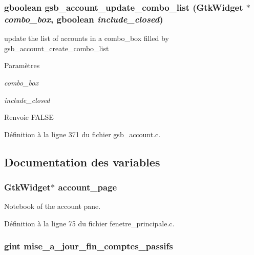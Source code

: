 \subsubsection[{gsb\_\-account\_\-update\_\-combo\_\-list}]{\setlength{\rightskip}{0pt plus 5cm}gboolean gsb\_\-account\_\-update\_\-combo\_\-list (GtkWidget $\ast$ {\em combo\_\-box}, \/  gboolean {\em include\_\-closed})}\label{gsb__account_8c_a62f0c33eae4fe6957f7668da14e47020}
update the list of accounts in a combo\_\-box filled by gsb\_\-account\_\-create\_\-combo\_\-list


\begin{DoxyParams}{Paramètres}
\item[{\em combo\_\-box}]\item[{\em include\_\-closed}]\end{DoxyParams}
\begin{DoxyReturn}{Renvoie}
FALSE 
\end{DoxyReturn}


Définition à la ligne 371 du fichier gsb\_\-account.c.



\subsection{Documentation des variables}
\subsubsection[{account\_\-page}]{\setlength{\rightskip}{0pt plus 5cm}GtkWidget$\ast$ {\bf account\_\-page}}\label{gsb__account_8c_ad5443d986a9ab5d64dd84c5346c4b87c}
Notebook of the account pane. 

Définition à la ligne 75 du fichier fenetre\_\-principale.c.

\subsubsection[{mise\_\-a\_\-jour\_\-fin\_\-comptes\_\-passifs}]{\setlength{\rightskip}{0pt plus 5cm}gint {\bf mise\_\-a\_\-jour\_\-fin\_\-comptes\_\-passifs}}\label{gsb__account_8c_a9ebd251de44611d97ec364d1867a75ff}


